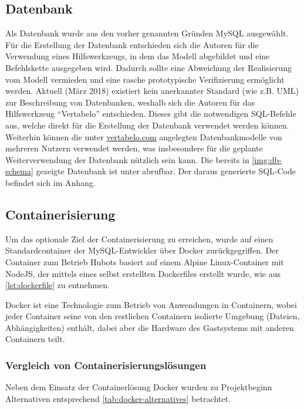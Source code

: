 \subsection{Datenbank}

Als Datenbank wurde aus den vorher genannten Gründen MySQL ausgewählt.
Für die Erstellung der Datenbank entschieden sich die Autoren für die Verwendung eines Hilfswerkzeugs, in dem das Modell abgebildet und eine Befehlskette ausgegeben wird. Dadurch sollte eine Abweichung der Realisierung vom Modell vermieden und eine rasche prototypische Verifizierung ermöglicht werden. Aktuell (März 2018) existiert kein anerkannter Standard (wie z.B. UML) zur Beschreibung von Datenbanken, weshalb sich die Autoren für das Hilfswerkzeug \enquote{Vertabelo} entschieden. Dieses gibt die notwendigen SQL-Befehle aus, welche direkt für die Erstellung der Datenbank verwendet werden können. Weiterhin können die unter \url{vertabelo.com} angelegten Datenbankmodelle von mehreren Nutzern verwendet werden, was insbesondere für die geplante Weiterverwendung der Datenbank nützlich sein kann.
Die bereits in \autoref{img:db-schema} gezeigte Datenbank ist unter \cite{VertabeloDesignYourDatabase2018} abrufbar. Der daraus generierte SQL-Code befindet sich im Anhang.


\subsection{Containerisierung}

Um das optionale Ziel der Containerisierung zu erreichen, wurde auf einen Standardcontainer der MySQL-Entwickler über Docker zurückgegriffen. Der Container zum Betrieb Hubots basiert auf einem Alpine Linux-Container mit NodeJS, der mittels eines selbst erstellten Dockerfiles erstellt wurde, wie aus \autoref{lst:dockerfile} zu entnehmen.


Docker ist eine Technologie zum Betrieb von Anwendungen in Containern, wobei jeder Container seine von den restlichen Containern isolierte Umgebung (Dateien, Abhängigkeiten) enthält, dabei aber die Hardware des Gastsystems mit anderen Containern teilt.

\subsubsection{Vergleich von Containerisierungslösungen}
Neben dem Einsatz der Containerlösung Docker wurden zu Projektbeginn Alternativen entsprechend \autoref{tab:docker-alternatives} betrachtet.

